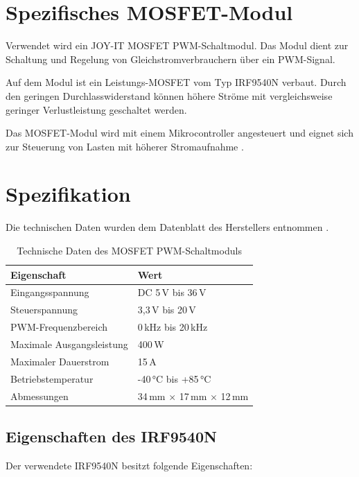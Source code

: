 \section{Spezifisches MOSFET-Modul}

Verwendet wird ein JOY-IT MOSFET PWM-Schaltmodul. 
Das Modul dient zur Schaltung und Regelung von Gleichstromverbrauchern über ein PWM-Signal.

Auf dem Modul ist ein Leistungs-MOSFET vom Typ IRF9540N verbaut. 
Durch den geringen Durchlasswiderstand können höhere Ströme mit vergleichsweise geringer Verlustleistung geschaltet werden.

Das MOSFET-Modul wird mit einem Mikrocontroller angesteuert und eignet sich zur Steuerung von Lasten mit höherer Stromaufnahme \cite{JoyITMOSFET:2025}.

\section{Spezifikation}

Die technischen Daten wurden dem Datenblatt des Herstellers entnommen \cite{JoyITMOSFET:2025}.

\begin{table}[htbp]
	\centering
	\caption{Technische Daten des MOSFET PWM-Schaltmoduls}
	\label{tab:mosfet_specification}
	\begin{tabular}{ll}
		\hline
		\textbf{Eigenschaft} & \textbf{Wert} \\
		\hline
		Eingangsspannung & DC 5\,V bis 36\,V \\
		Steuerspannung & 3,3\,V bis 20\,V \\
		PWM-Frequenzbereich & 0\,kHz bis 20\,kHz \\
		Maximale Ausgangsleistung & 400\,W \\
		Maximaler Dauerstrom & 15\,A \\
		Betriebstemperatur & -40\,°C bis +85\,°C \\
		Abmessungen & 34\,mm $\times$ 17\,mm $\times$ 12\,mm \\
		\hline
	\end{tabular}
\end{table}

\subsection{Eigenschaften des IRF9540N}

Der verwendete IRF9540N besitzt folgende Eigenschaften:

